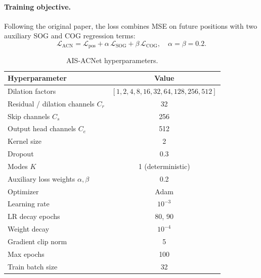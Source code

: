 \documentclass[12pt, a4paper]{article}
\begin{document}
\paragraph{Training objective.}
Following the original paper, the loss combines MSE on future positions
with two auxiliary SOG and COG regression terms:
\begin{equation}
  \mathcal{L}_{\text{ACN}} = \mathcal{L}_{\text{pos}}
                + \alpha\,\mathcal{L}_{\text{SOG}}
                + \beta\,\mathcal{L}_{\text{COG}},
  \quad \alpha = \beta = 0.2.
  \label{eq:acnet_loss}
\end{equation}

\begin{table}[H]
  \centering
  \caption{AIS-ACNet hyperparameters.}
  \label{tab:acnet_hp}
  \begin{tabular}{lc}
    \toprule
    \textbf{Hyperparameter} & \textbf{Value} \\
    \midrule
    Dilation factors                    & $[1,2,4,8,16,32,64,128,256,512]$ \\
    Residual / dilation channels $C_r$  & 32 \\
    Skip channels $C_s$                 & 256 \\
    Output head channels $C_e$          & 512 \\
    Kernel size                         & 2 \\
    Dropout                             & 0.3 \\
    Modes $K$                           & 1 (deterministic) \\
    Auxiliary loss weights $\alpha,\beta$ & 0.2 \\
    Optimizer                           & Adam \\
    Learning rate                       & $10^{-3}$ \\
    LR decay epochs                     & 80, 90 \\
    Weight decay                        & $10^{-4}$ \\
    Gradient clip norm                  & 5 \\
    Max epochs                          & 100 \\
    Train batch size                    & 32 \\
    \bottomrule
  \end{tabular}
\end{table}


\end{document}

